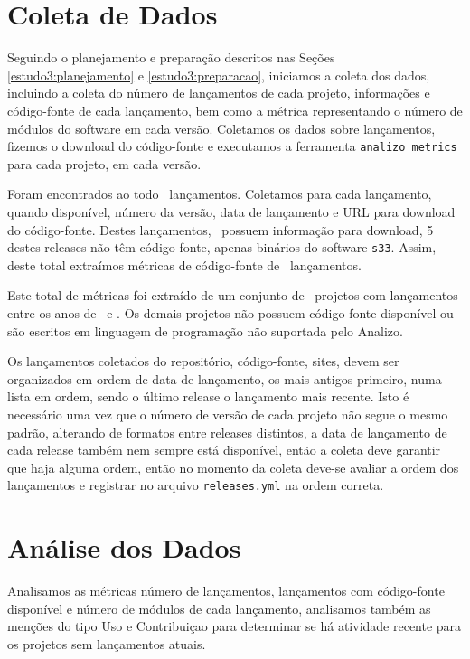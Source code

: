 
\section{Coleta de Dados} \label{estudo3:coleta} %

Seguindo o planejamento e preparação descritos nas Seções
\ref{estudo3:planejamento} e \ref{estudo3:preparacao}, iniciamos a coleta dos
dados, incluindo a coleta do número de lançamentos de cada projeto, informações
e código-fonte de cada lançamento, bem como a métrica representando o número de
módulos do software em cada versão. Coletamos os dados sobre lançamentos,
fizemos o download do código-fonte e executamos a ferramenta \texttt{analizo
metrics} para cada projeto, em cada versão.

Foram encontrados ao todo \ReleasesCount \ lançamentos. Coletamos para cada
lançamento, quando disponível, número da versão, data de lançamento e URL para
download do código-fonte. Destes lançamentos, \ReleasesAvailableCount \ possuem
informação para download, 5 destes releases não têm código-fonte, apenas
binários do software \texttt{s33}. Assim, deste total extraímos métricas
de código-fonte de \ReleasesMetricsCount \ lançamentos.

Este total de métricas foi extraído de um conjunto de \ProjectsAnalizedCount \
projetos com lançamentos entre os anos de \ReleasesYearFirst \ e \ReleasesYearLast.
Os demais projetos não possuem código-fonte disponível ou são
escritos em linguagem de programação não suportada pelo Analizo.

Os lançamentos coletados do repositório, código-fonte, sites, devem ser
organizados em ordem de data de lançamento, os mais antigos primeiro, numa
lista em ordem, sendo o último release o lançamento mais recente. Isto é
necessário uma vez que o número de versão de cada projeto não segue o mesmo
padrão, alterando de formatos entre releases distintos, a data de lançamento de
cada release também nem sempre está disponível, então a coleta deve garantir
que haja alguma ordem, então no momento da coleta deve-se avaliar a ordem dos
lançamentos e registrar no arquivo \texttt{releases.yml} na ordem correta.


\section{Análise dos Dados} \label{estudo3:analise} %

Analisamos as métricas número de lançamentos, lançamentos com código-fonte disponível
e número de módulos de cada lançamento, 
analisamos também as
menções do tipo Uso e Contribuiçao para determinar se há atividade recente para
os projetos sem lançamentos atuais.

